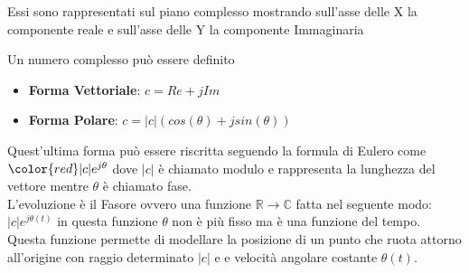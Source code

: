 \documentclass{article}
\begin{document}
    \noindent
    \begin{minipage}{.5\textwidth}
        Essi sono rappresentati sul piano complesso mostrando sull'asse delle X la componente reale e sull'asse delle Y la componente Immaginaria
    \end{minipage}
    \hspace{0.5cm}
    \begin{minipage}{.4\textwidth}
    \end{minipage}
    
    \noindent
    Un numero complesso può essere definito
    \begin{itemize}
        \item \textbf{Forma Vettoriale}: $c=Re+jIm$
        \item \textbf{Forma Polare}: $c=|c|(cos(\theta)+jsin(\theta))$
    \end{itemize}

    \noindent
    Quest'ultima forma può essere riscritta seguendo la formula di Eulero come $\color{red}|c|e^{j\theta}$ dove $|c|$ è chiamato modulo e rappresenta la lunghezza del vettore mentre $\theta$ è chiamato fase.\\
    
    \noindent
    L'evoluzione è il Fasore ovvero una funzione $\mathbb{R}\rightarrow\mathbb{C}$ fatta nel seguente modo:\\$|c|e^{j\theta(t)}$ in questa funzione $\theta$ non è più fisso ma è una funzione del tempo.\\
    Questa funzione permette di modellare la posizione di un punto
    che ruota attorno all’origine con raggio determinato $|c|$ e e velocità angolare costante $\theta(t)$.\\
    
\end{document}
